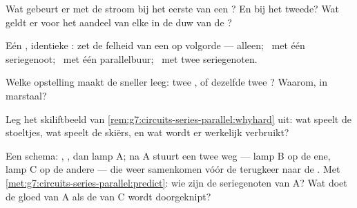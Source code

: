 \begin{exercise}[$\star$]\label{exo:g7:circuits-series-parallel:5}
Wat gebeurt er met de stroom bij het eerste  van een
? En bij het tweede? Wat geldt er voor het
aandeel van elke  in de duw van de ?
\end{exercise}

\begin{exercise}[$\star$]\label{exo:g7:circuits-series-parallel:6}
Eén , identieke : zet de felheid van een
 op volgorde --- alleen; \ met één seriegenoot; \ met één
parallelbuur; \ met twee seriegenoten.
\end{exercise}

\begin{exercise}[$\star$]\label{exo:g7:circuits-series-parallel:7}
Welke opstelling maakt de  sneller leeg: twee 
, of dezelfde twee ? Waarom, in marstaal?
\end{exercise}

\begin{exercise}[$\star$]\label{exo:g7:circuits-series-parallel:8}
Leg het skiliftbeeld van
\cref{rem:g7:circuits-series-parallel:whyhard} uit: wat speelt de
stoeltjes, wat speelt de skiërs, en wat wordt er werkelijk verbruikt?
\end{exercise}

\begin{exercise}[$\star\star$]\label{exo:g7:circuits-series-parallel:9}
Een schema: , , dan lamp A; na A stuurt een
 twee  weg --- lamp B op de ene, lamp C op de
andere --- die weer samenkomen vóór de terugkeer naar de
. Met \cref{met:g7:circuits-series-parallel:predict}: wie zijn
de seriegenoten van A? Wat doet de gloed van A als de  van C
wordt doorgeknipt?
\end{exercise}

